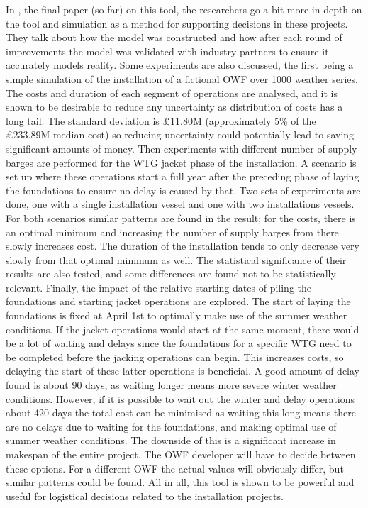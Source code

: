 \documentclass[a4paper,12pt]{article}
\begin{document}
In \cite{barlow2017using}, the final paper (so far) on this tool, the researchers go a bit more in depth on the tool and simulation as a method for supporting decisions in these projects. They talk about how the model was constructed and how after each round of improvements the model was validated with industry partners to ensure it accurately models reality. Some experiments are also discussed, the first being a simple simulation of the installation of a fictional OWF over 1000 weather series. The costs and duration of each segment of operations are analysed, and it is shown to be desirable to reduce any uncertainty as distribution of costs has a long tail. The standard deviation is \pounds 11.80M (approximately 5\% of the \pounds 233.89M median cost) so reducing uncertainty could potentially lead to saving significant amounts of money. Then experiments with different number of supply barges are performed for the WTG jacket phase of the installation. A scenario is set up where these operations start a full year after the preceding phase of laying the foundations to ensure no delay is caused by that. Two sets of experiments are done, one with a single installation vessel and one with two installations vessels. For both scenarios similar patterns are found in the result; for the costs, there is an optimal minimum and increasing the number of supply barges from there slowly increases cost. The duration of the installation tends to only decrease very slowly from that optimal minimum as well. The statistical significance of their results are also tested, and some differences are found not to be statistically relevant. Finally, the impact of the relative starting dates of piling the foundations and starting jacket operations are explored. The start of laying the foundations is fixed at April 1st to optimally make use of the summer weather conditions. If the jacket operations would start at the same moment, there would be a lot of waiting and delays since the foundations for a specific WTG need to be completed before the jacking operations can begin. This increases costs, so delaying the start of these latter operations is beneficial. A good amount of delay found is about 90 days, as waiting longer means more severe winter weather conditions. However, if it is possible to wait out the winter and delay operations about 420 days the total cost can be minimised as waiting this long means there are no delays due to waiting for the foundations, and making optimal use of summer weather conditions. The downside of this is a significant increase in makespan of the entire project. The OWF developer will have to decide between these options. For a different OWF the actual values will obviously differ, but similar patterns could be found. All in all, this tool is shown to be powerful and useful for logistical decisions related to the installation projects. 
\end{document}
